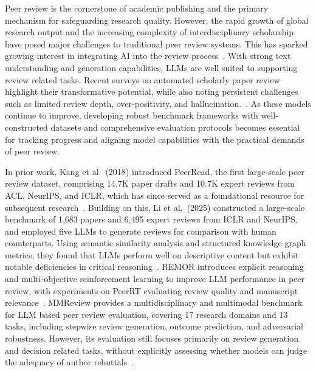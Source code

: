 \documentclass[preprint,10pt,times]{elsarticle}
\begin{document}
Peer review is the cornerstone of academic publishing and the primary mechanism for safeguarding research quality. However, the rapid growth of global research output and the increasing complexity of interdisciplinary scholarship have posed major challenges to traditional peer review systems. This has sparked growing interest in integrating AI into the review process~\cite{ref5}. With strong text understanding and generation capabilities, LLMs are well suited to supporting review related tasks. Recent surveys on automated scholarly paper review highlight their transformative potential, while also noting persistent challenges such as limited review depth, over-positivity, and hallucination.~\cite{ref6}. As these models continue to improve, developing robust benchmark frameworks with well-constructed datasets and comprehensive evaluation protocols becomes essential for tracking progress and aligning model capabilities with the practical demands of peer review.

In prior work, Kang et al.\ (2018) introduced PeerRead, the first large-scale peer review dataset, comprising 14.7K paper drafts and 10.7K expert reviews from ACL, NeurIPS, and ICLR, which has since served as a foundational resource for subsequent research~\cite{ref7}. Building on this, Li et al.\ (2025) constructed a large-scale benchmark of 1,683 papers and 6,495 expert reviews from ICLR and NeurIPS, and employed five LLMs to generate reviews for comparison with human counterparts. Using semantic similarity analysis and structured knowledge graph metrics, they found that LLMs perform well on descriptive content but exhibit notable deficiencies in critical reasoning~\cite{ref8}. REMOR introduces explicit reasoning and multi-objective reinforcement learning to improve LLM performance in peer review, with experiments on PeerRT evaluating review quality and manuscript relevance~\cite{ref9}. MMReview provides a multidisciplinary and multimodal benchmark for LLM based peer review evaluation, covering 17 research domains and 13 tasks, including stepwise review generation, outcome prediction, and adversarial robustness. However, its evaluation still focuses primarily on review generation and decision related tasks, without explicitly assessing whether models can judge the adequacy of author rebuttals~\cite{ref10}.
\end{document}
